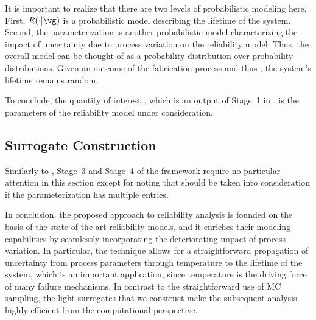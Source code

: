 \begin{remark} 
It is important to realize that there are two levels of probabilistic modeling
here. First, $R(\cdot | \vg)$ \perse is a probabilistic model describing the
lifetime \life of the system. Second, the parameterization \vg is another
probabilistic model characterizing the impact of uncertainty due to process
variation on the reliability model. Thus, the overall model can be thought of as
a probability distribution over probability distributions. Given an outcome of
the fabrication process and thus \vg, the system's lifetime remains random.
\end{remark}

To conclude, the quantity of interest \g, which is an output of Stage~1 in
, is the parameters \vg of the reliability model under
consideration.

\subsection{Surrogate Construction}

Similarly to , Stage~3 and Stage~4 of the
framework require no particular attention in this section except for noting that
 should be taken into consideration if the
parameterization \vg has multiple entries.

\conclusioncut
In conclusion, the proposed approach to reliability analysis is founded on the
basis of the state-of-the-art reliability models, and it enriches their modeling
capabilities by seamlessly incorporating the deteriorating impact of process
variation. In particular, the technique allows for a straightforward propagation
of uncertainty from process parameters through temperature to the lifetime of
the system, which is an important application, since temperature is the driving
force of many failure mechanisms. In contrast to the straightforward use of
\ac{MC} sampling, the light surrogates that we construct make the subsequent
analysis highly efficient from the computational perspective.
